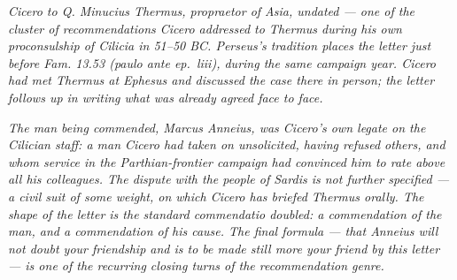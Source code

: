 
\textit{Cicero to Q. Minucius Thermus, propraetor of Asia,
undated --- one of the cluster of recommendations Cicero
addressed to Thermus during his own proconsulship of Cilicia
in 51--50 BC. Perseus's tradition places the letter just
before \textit{Fam.} 13.53 (\textit{paulo ante ep.\ liii}),
during the same campaign year. Cicero had met Thermus at
Ephesus and discussed the case there in person; the letter
follows up in writing what was already agreed face to face.}

\textit{The man being commended, Marcus Anneius, was Cicero's
own legate on the Cilician staff: a man Cicero had taken on
unsolicited, having refused others, and whom service in the
Parthian-frontier campaign had convinced him to rate above
all his colleagues. The dispute with the people of Sardis is
not further specified --- a civil suit of some weight, on
which Cicero has briefed Thermus orally. The shape of the
letter is the standard \textit{commendatio} doubled: a
commendation of the man, and a commendation of his cause. The
final formula --- that Anneius will not doubt your friendship
and is to be made still more your friend by this letter ---
is one of the recurring closing turns of the recommendation
genre.}
